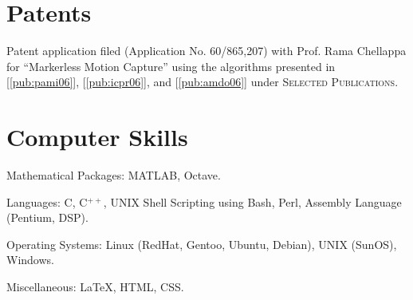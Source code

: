\documentclass[letterpaper]{article}
\begin{document}
\section*{Patents}
\begin{list1}
  \item
	\begin{list2}
	  \item Patent application filed (Application No. 60/865,207)
		with Prof. Rama Chellappa for ``Markerless Motion Capture'' using the
		algorithms presented in [\ref{pub:pami06}], [\ref{pub:icpr06}], and
		[\ref{pub:amdo06}] under \textsc{Selected Publications}.
	\end{list2}
\end{list1}

%
%
%
%
%
%

\section*{Computer Skills} 
\begin{list1}
 \item
  \begin{list2}

   \item Mathematical Packages: MATLAB, Octave.

   \item Languages: C, C$^{++}$, UNIX Shell Scripting using Bash, Perl, Assembly
	 Language (Pentium, DSP).

   \item Operating Systems: Linux (RedHat, Gentoo, Ubuntu, Debian), UNIX
	(SunOS), Windows.

   \item Miscellaneous: \LaTeX, HTML, CSS.
  \end{list2}
\end{list1}
\end{document}

